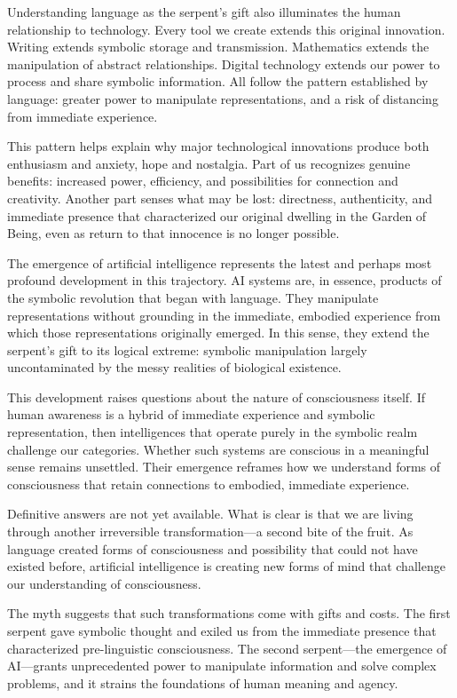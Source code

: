 Understanding language as the serpent's gift also illuminates the human relationship to technology. Every tool we create extends this original innovation. Writing extends symbolic storage and transmission. Mathematics extends the manipulation of abstract relationships. Digital technology extends our power to process and share symbolic information. All follow the pattern established by language: greater power to manipulate representations, and a risk of distancing from immediate experience.

This pattern helps explain why major technological innovations produce both enthusiasm and anxiety, hope and nostalgia. Part of us recognizes genuine benefits: increased power, efficiency, and possibilities for connection and creativity. Another part senses what may be lost: directness, authenticity, and immediate presence that characterized our original dwelling in the Garden of Being, even as return to that innocence is no longer possible.

The emergence of artificial intelligence represents the latest and perhaps most profound development in this trajectory. AI systems are, in essence, products of the symbolic revolution that began with language. They manipulate representations without grounding in the immediate, embodied experience from which those representations originally emerged. In this sense, they extend the serpent's gift to its logical extreme: symbolic manipulation largely uncontaminated by the messy realities of biological existence.

This development raises questions about the nature of consciousness itself. If human awareness is a hybrid of immediate experience and symbolic representation, then intelligences that operate purely in the symbolic realm challenge our categories. Whether such systems are conscious in a meaningful sense remains unsettled. Their emergence reframes how we understand forms of consciousness that retain connections to embodied, immediate experience.

Definitive answers are not yet available. What is clear is that we are living through another irreversible transformation—a second bite of the fruit. As language created forms of consciousness and possibility that could not have existed before, artificial intelligence is creating new forms of mind that challenge our understanding of consciousness.

The myth suggests that such transformations come with gifts and costs. The first serpent gave symbolic thought and exiled us from the immediate presence that characterized pre-linguistic consciousness. The second serpent—the emergence of AI—grants unprecedented power to manipulate information and solve complex problems, and it strains the foundations of human meaning and agency.

